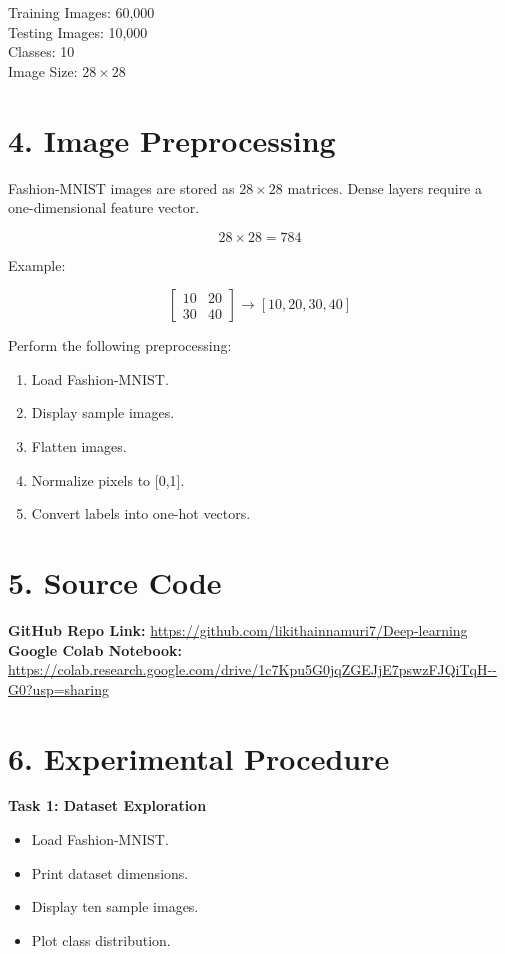 \documentclass[11pt]{article}
\begin{document}
Training Images: 60,000 \\
Testing Images: 10,000 \\
Classes: 10 \\
Image Size: $28\times28$

\section*{4. Image Preprocessing}

Fashion-MNIST images are stored as $28\times28$ matrices. Dense layers require a one-dimensional feature vector.

\[
28\times28=784
\]

Example:

\[
\begin{bmatrix}
10&20\\30&40
\end{bmatrix}
\rightarrow
[10,20,30,40]
\]

Perform the following preprocessing:

\begin{enumerate}
\item Load Fashion-MNIST.
\item Display sample images.
\item Flatten images.
\item Normalize pixels to [0,1].
\item Convert labels into one-hot vectors.
\end{enumerate}
\section*{5. Source Code}

\textbf{GitHub Repo Link:} \url{https://github.com/likithainnamuri7/Deep-learning}\\[3mm]
\textbf{Google Colab Notebook:} \url{https://colab.research.google.com/drive/1c7Kpu5G0jqZGEJjE7pswzFJQiTqH--G0?usp=sharing}

\section*{6. Experimental Procedure}

\textbf{Task 1: Dataset Exploration}
\begin{itemize}
\item Load Fashion-MNIST.
\item Print dataset dimensions.
\item Display ten sample images.
\item Plot class distribution.
\end{itemize}
\end{document}
